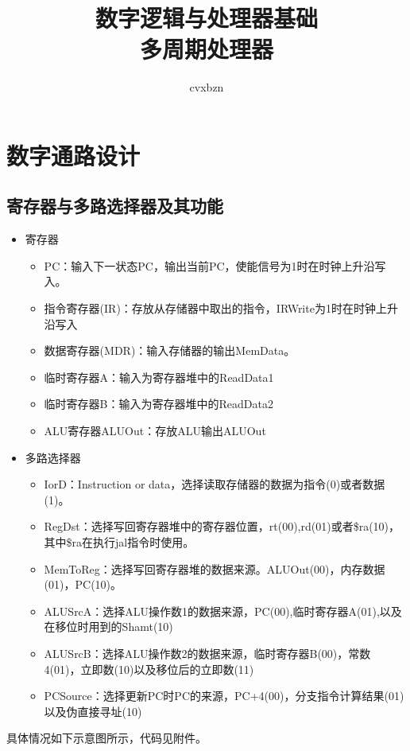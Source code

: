 \documentclass{article}
\title{数字逻辑与处理器基础\\多周期处理器}
\author{cvxbzn}
\begin{document}
\maketitle
\tableofcontents
\newpage
\section{数字通路设计}
\subsection{寄存器与多路选择器及其功能}
\begin{itemize}
    \item 寄存器
          \begin{itemize}
              \item PC：输入下一状态PC，输出当前PC，使能信号为1时在时钟上升沿写入。
              \item 指令寄存器(IR)：存放从存储器中取出的指令，IRWrite为1时在时钟上升沿写入
              \item 数据寄存器(MDR)：输入存储器的输出MemData。
              \item 临时寄存器A：输入为寄存器堆中的ReadData1
              \item 临时寄存器B：输入为寄存器堆中的ReadData2
              \item ALU寄存器ALUOut：存放ALU输出ALUOut
          \end{itemize}
    \item 多路选择器
          \begin{itemize}
              \item IorD：Instruction or data，选择读取存储器的数据为指令(0)或者数据(1)。
              \item RegDst：选择写回寄存器堆中的寄存器位置，rt(00),rd(01)或者\$ra(10)，其中\$ra在执行jal指令时使用。
              \item MemToReg：选择写回寄存器堆的数据来源。ALUOut(00)，内存数据(01)，PC(10)。
              \item ALUSrcA：选择ALU操作数1的数据来源，PC(00),临时寄存器A(01),以及在移位时用到的Shamt(10)
              \item ALUSrcB：选择ALU操作数2的数据来源，临时寄存器B(00)，常数4(01)，立即数(10)以及移位后的立即数(11)
              \item PCSource：选择更新PC时PC的来源，PC+4(00)，分支指令计算结果(01)以及伪直接寻址(10)
          \end{itemize}
\end{itemize}
具体情况如下示意图所示，代码见附件。
\end{document}

